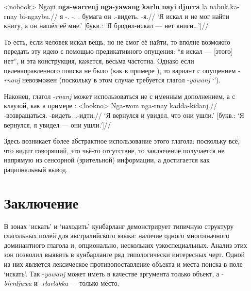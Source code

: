 \ex<nobook>\begingl
\gla Ngayi \textbf{nga}-\textbf{warrenj} \textbf{nga}-\textbf{yawang} \textbf{karlu} \textbf{nayi} \textbf{djurra} la nabuk ka-rnay bi-ngaybu.//
\glb я \nga-\warre.\Pst{} \nga-\yaw.\Pst{} \karlu{} \Nm.\Cli{} бумага \la{} он \Tsg.\Real-видеть.\Pst{} \bi-я.\Gen{}//
\glft `Я искал и не мог найти книгу, а он нашёл её мне.' [букв.: `Я бродил-искал --- нет книги\ldots']//%
\endgl\xe

То есть, если человек искал вещь, но не смог её найти, то вполне возможно передать эту идею с помощью предикативного опущения: ``я искал --- [этого] нет'', и эта конструкция, кажется, весьма частотна. Однако если целенаправленного поиска не было (как в примере ), то вариант с опущением -\textit{rnanj} невозможен (поскольку в этом случае требуется глагол -\textit{yawanj} `\yaw').

Наконец, глагол -\textit{rnanj} может использоваться не с именным дополнением, а с клаузой, как в примере :
\ex<lookno>\begingl
\gla Nga-wom nga-rnay kadda-kidanj.//
\glb \nga-возвращаться.\Pst{} \nga-видеть.\Pst{} \Tpl.\Real-идти.\Pst{}//
\glft `Я вернулся и увидел, что они ушли.' [букв.: `Я вернулся, я увидел --- они ушли.']//%
\endgl\xe

Здесь возникает более абстрактное использование этого глагола: поскольку всё, что видит говорящий, это чьё-то отсутствие, то заключение получается не напрямую из сенсорной (зрительной) информации, а достигается как рациональный вывод.

\section{Заключение}
\label{sec:outro}
В зонах `искать' и `находить' кунбарланг демонстрирует типичную структуру глагольных полей для австралийского языка: наличие одного многозначного доминантного глагола и, опционально, нескольких узкоспециальных. Анализ этих зон позволил выявить в кунбарланге ряд типологически интересных черт. Одной из них является лексическое противопоставление объекта и места поиска в поле `искать'. Так -\textit{yawanj} может иметь в качестве аргумента только объект, а -\textit{birrdjuwa} и -\textit{rlarlakka} --- только место. 

